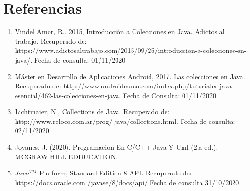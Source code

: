 \documentclass[12pt, letterpaper]{report}
\begin{document}
\section*{Referencias}

\begin{enumerate}
  \item 
  Vindel Amor, R., 2015, Introducción a Colecciones en Java. Adictos al trabajo. Recuperado de: https://www.adictosaltrabajo.com/2015/09/25/introduccion-a-colecciones-en-java/. Fecha de consulta: 01/11/2020
  
  \item 
  Máster en Desarrollo de Aplicaciones Android, 2017. Las colecciones en Java. Recuperado de: http://www.androidcurso.com/index.php/tutoriales-java-esencial/462-las-colecciones-en-java. Fecha de Consulta: 01/11/2020
  
  \item Lichtmaier, N., Collections de Java. Recuperado de:  http://www.reloco.com.ar/prog/ java/collections.html. Fecha de consulta: 02/11/2020
  
  \item Joyanes, J. (2020). Programacion En C/C++ Java Y Uml (2.a ed.). MCGRAW HILL EDDUCATION.
  
  \item
  $Java^{TM}$ Platform, Standard Edition 8 API. Recuperado de: https://docs.oracle.com /javase/8/docs/api/ Fecha de consulta 31/10/2020
\end{enumerate}
\end{document}

